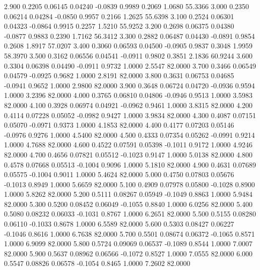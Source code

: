    2.900   0.2205   0.06145   0.04240  -0.0839   0.9989   0.2069   1.0680  55.3366
   3.000   0.2350   0.06214   0.04284  -0.0850   0.9957   0.2166   1.2625  55.6398
   3.100   0.2524   0.06301   0.04323  -0.0864   0.9915   0.2257   1.5210  55.9252
   3.200   0.2698   0.06375   0.04380  -0.0877   0.9883   0.2390   1.7162  56.3412
   3.300   0.2882   0.06487   0.04430  -0.0891   0.9854   0.2608   1.8917  57.0207
   3.400   0.3060   0.06593   0.04500  -0.0905   0.9837   0.3048   1.9959  58.3970
   3.500   0.3162   0.06556   0.04541  -0.0911   0.9802   0.3851   2.1836  60.9244
   3.600   0.3304   0.06398   0.04490  -0.0911   0.9732   1.0000   2.5547  82.0000
   3.700   0.3466   0.06549   0.04579  -0.0925   0.9682   1.0000   2.8191  82.0000
   3.800   0.3631   0.06753   0.04685  -0.0941   0.9652   1.0000   2.9800  82.0000
   3.900   0.3648   0.06724   0.04720  -0.0936   0.9594   1.0000   3.2396  82.0000
   4.000   0.3765   0.06810   0.04806  -0.0946   0.9513   1.0000   3.5983  82.0000
   4.100   0.3928   0.06974   0.04921  -0.0962   0.9461   1.0000   3.8315  82.0000
   4.200   0.4114   0.07228   0.05052  -0.0982   0.9427   1.0000   3.9834  82.0000
   4.300   0.4087   0.07151   0.05070  -0.0971   0.9373   1.0000   4.1853  82.0000
   4.400   0.4177   0.07203   0.05146  -0.0976   0.9276   1.0000   4.5400  82.0000
   4.500   0.4333   0.07354   0.05262  -0.0991   0.9214   1.0000   4.7688  82.0000
   4.600   0.4522   0.07591   0.05398  -0.1011   0.9172   1.0000   4.9246  82.0000
   4.700   0.4656   0.07821   0.05512  -0.1023   0.9147   1.0000   5.0138  82.0000
   4.800   0.4578   0.07668   0.05513  -0.1004   0.9096   1.0000   5.1810  82.0000
   4.900   0.4631   0.07689   0.05575  -0.1004   0.9011   1.0000   5.4624  82.0000
   5.000   0.4750   0.07803   0.05676  -0.1013   0.8949   1.0000   5.6659  82.0000
   5.100   0.4909   0.07978   0.05800  -0.1028   0.8900   1.0000   5.8262  82.0000
   5.200   0.5111   0.08267   0.05949  -0.1049   0.8863   1.0000   5.9484  82.0000
   5.300   0.5200   0.08452   0.06049  -0.1055   0.8840   1.0000   6.0256  82.0000
   5.400   0.5080   0.08232   0.06033  -0.1031   0.8767   1.0000   6.2651  82.0000
   5.500   0.5155   0.08280   0.06110  -0.1033   0.8678   1.0000   6.5589  82.0000
   5.600   0.5303   0.08427   0.06227  -0.1046   0.8616   1.0000   6.7638  82.0000
   5.700   0.5501   0.08674   0.06372  -0.1065   0.8571   1.0000   6.9099  82.0000
   5.800   0.5724   0.09069   0.06537  -0.1089   0.8544   1.0000   7.0007  82.0000
   5.900   0.5637   0.08962   0.06566  -0.1072   0.8527   1.0000   7.0555  82.0000
   6.000   0.5547   0.08826   0.06578  -0.1054   0.8465   1.0000   7.2602  82.0000
